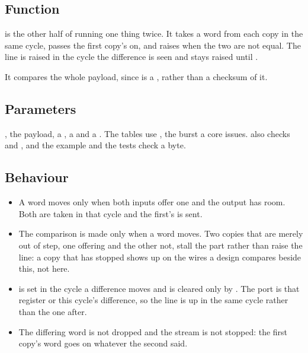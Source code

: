 
%
{}

\subsection*{Function}

 is the other half of running one thing twice. It takes
a word from each copy in the same cycle, passes the first copy's on,
and raises  when the two are not equal. The line is
raised in the cycle the difference is seen and stays raised until
.

It compares the whole payload, since  is a ,
rather than a checksum of it.

\subsection*{Parameters}

, the payload, a , a  and a
. The tables use , the burst a core
issues.  also checks  and ,
and the example and the tests check a byte.


\subsection*{Behaviour}

\begin{itemize}
\item A word moves only when both inputs offer one and the output has
room. Both are taken in that cycle and the first's is sent.
\item The comparison is made only when a word moves. Two copies that
are merely out of step, one offering and the other not, stall the part
rather than raise the line: a copy that has stopped shows up on the
wires a design compares beside this, not here.
\item {} is set in the cycle a difference moves and is
cleared only by . The  port is that register
or this cycle's difference, so the line is up in the same cycle rather
than the one after.
\item The differing word is not dropped and the stream is not stopped:
the first copy's word goes on whatever the second said.
\end{itemize}

